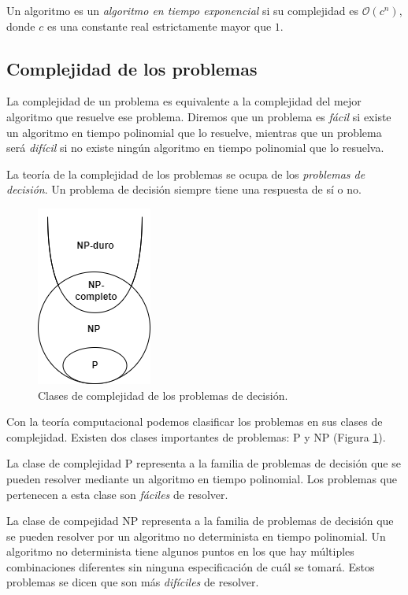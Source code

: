 \begin{definition}
    Un algoritmo es un \emph{algoritmo en tiempo exponencial} si su complejidad es $\mathcal{O}(c^n)$, donde $c$ es una constante real estrictamente mayor que $1$.
\end{definition}

\subsection{Complejidad de los problemas}

La complejidad de un problema es equivalente a la complejidad del mejor algoritmo que resuelve ese problema. Diremos que un problema es \emph{fácil} si existe un algoritmo en tiempo polinomial que lo resuelve, mientras que un problema será \emph{difícil} si no existe ningún algoritmo en tiempo polinomial que lo resuelva.

La teoría de la complejidad de los problemas se ocupa de los \emph{problemas de decisión}. Un problema de decisión siempre tiene una respuesta de sí o no.

\begin{figure}[H]   
	\center
	\includegraphics[scale=0.5]{figures/Complejidad.png}
	\caption{Clases de complejidad de los problemas de decisión.}
    \label{fg:complexity}
\end{figure}

Con la teoría computacional podemos clasificar los problemas en sus clases de complejidad. Existen dos clases importantes de problemas: P y NP (Figura \ref{fg:complexity}).

La clase de complejidad P representa a la familia de problemas de decisión que se pueden resolver mediante un algoritmo en tiempo polinomial. Los problemas que pertenecen a esta clase son \emph{fáciles} de resolver.

La clase de compejidad NP representa a la familia de problemas de decisión que se pueden resolver por un algoritmo no determinista en tiempo polinomial. Un algoritmo no determinista tiene algunos puntos en los que hay múltiples combinaciones diferentes sin ninguna especificación de cuál se tomará. Estos problemas se dicen que son más \emph{difíciles} de resolver.

